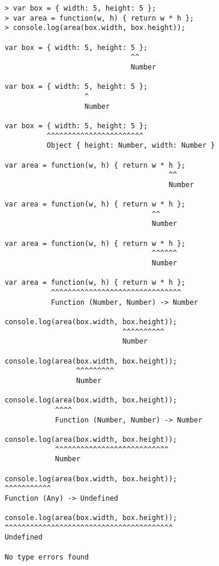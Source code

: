 \documentclass[british, twoside, openright]{bhamthesis}
\theoremstyle{definition}
\begin{document}
      \begin{lstlisting}
      > var box = { width: 5, height: 5 };
      > var area = function(w, h) { return w * h };
      > console.log(area(box.width, box.height));

      var box = { width: 5, height: 5 };
                                    ^^
                                    Number

      var box = { width: 5, height: 5 };
                         ^
                         Number

      var box = { width: 5, height: 5 };
                ^^^^^^^^^^^^^^^^^^^^^^^
                Object { height: Number, width: Number }

      var area = function(w, h) { return w * h };
                                             ^^
                                             Number

      var area = function(w, h) { return w * h };
                                         ^^
                                         Number

      var area = function(w, h) { return w * h };
                                         ^^^^^^
                                         Number

      var area = function(w, h) { return w * h };
                 ^^^^^^^^^^^^^^^^^^^^^^^^^^^^^^^
                 Function (Number, Number) -> Number

      console.log(area(box.width, box.height));
                                  ^^^^^^^^^^
                                  Number

      console.log(area(box.width, box.height));
                       ^^^^^^^^^
                       Number

      console.log(area(box.width, box.height));
                  ^^^^
                  Function (Number, Number) -> Number

      console.log(area(box.width, box.height));
                  ^^^^^^^^^^^^^^^^^^^^^^^^^^^
                  Number

      console.log(area(box.width, box.height));
      ^^^^^^^^^^^
      Function (Any) -> Undefined

      console.log(area(box.width, box.height));
      ^^^^^^^^^^^^^^^^^^^^^^^^^^^^^^^^^^^^^^^^
      Undefined

      No type errors found
      \end{lstlisting}
\end{document}

